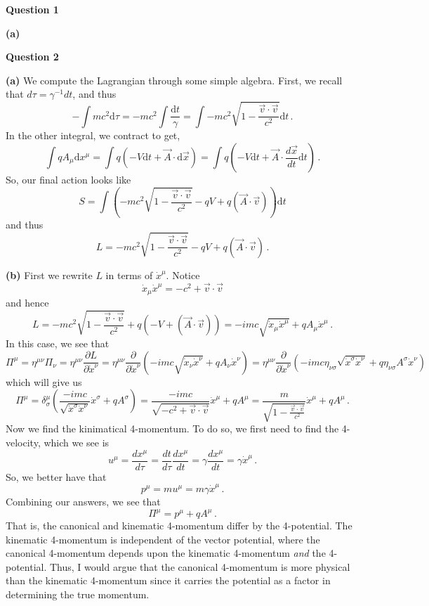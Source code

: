 \documentclass[10pt]{article}
\newcommand{\dif}{\text{d}}
\newcommand{\di}[2][]{\frac{\partial #1}{\partial #2}}
\newcommand{\del}[2][]{\frac{d #1}{d #2}}
\begin{document}
\textbf{Question 1}

\textbf{(a)}

\newpage
\textbf{Question 2}

\textbf{(a)} We compute the Lagrangian through some simple algebra. First, we recall that $d\tau = \gamma^{-1}dt$, and thus
\[ -\int mc^{2}\dif\tau = -mc^{2}\int \frac{\dif t}{\gamma} = \int -mc^{2}\sqrt{1 - \frac{\vec{v}\cdot\vec{v}}{c^{2}}}\dif t\, .\]
In the other integral, we contract to get,
\[ \int qA_{\mu}\dif x^{\mu} = \int q (-V\dif t + \vec{A}\cdot \dif\vec{x}) = \int q\left(-V\dif t + \vec{A}\cdot \del[\vec{x}]{t}\dif t\right)\, . \]
So, our final action looks like
\[ S = \int \left (-mc^{2}\sqrt{1 - \frac{\vec{v}\cdot\vec{v}}{c^{2}}} - qV + q(\vec{A}\cdot \vec{v})\right )\dif t\]
and thus
\[ L = -mc^{2}\sqrt{1 - \frac{\vec{v}\cdot\vec{v}}{c^{2}}} - qV + q(\vec{A}\cdot \vec{v}) \, .\]

\textbf{(b)} First we rewrite $L$ in terms of $\dot{x}^{\mu}$. Notice
\[ \dot{x}_{\mu}\dot{x}^{\mu} = -c^{2} + \vec{v}\cdot\vec{v} \]
and hence
\[ L = -mc^{2}\sqrt{1 - \frac{\vec{v}\cdot\vec{v}}{c^{2}}} + q(-V + (\vec{A}\cdot\vec{v})) = -imc\sqrt{\dot{x}_{\mu}\dot{x}^{\mu}} + qA_{\mu}\dot{x}^{\mu}\, .\]
In this case, we see that
\[ \Pi^{\mu} = \eta^{\mu\nu}\Pi_{\nu} = \eta^{\mu\nu}\di[L]{\dot{x}^{\nu}} = \eta^{\mu\nu}\di{\dot{x}^{\nu}}\left(-imc\sqrt{\dot{x}_{\nu}\dot{x}^{\nu}} + qA_{\nu}\dot{x}^{\nu}\right) = \eta^{\mu\nu}\di{\dot{x}^{\nu}}\left(-imc\eta_{\nu\sigma}\sqrt{\dot{x}^{\sigma}\dot{x}^{\nu}} + q\eta_{\nu\sigma}A^{\sigma}\dot{x}^{\nu}\right) \]
which will give us
\[ \Pi^{\mu} = \delta^{\mu}_{\sigma}\left(\frac{-imc}{\sqrt{\dot{x}^{\sigma}\dot{x}^{\nu}}}\dot{x}^{\sigma} + qA^{\sigma}\right) = \frac{-imc}{\sqrt{-c^{2} + \vec{v}\cdot\vec{v}}}\dot{x}^{\mu} + qA^{\mu} = \frac{m}{\sqrt{1 - \frac{\vec{v}\cdot\vec{v}}{c^{2}}}}\dot{x}^{\mu} + qA^{\mu}\, .\]
Now we find the kinimatical 4-momentum. To do so, we first need to find the 4-velocity, which we see is
\[ u^{\mu} = \del[x^{\mu}]{\tau} = \del[t]{\tau}\del[x^{\mu}]{t} = \gamma\del[x^{\mu}]{t}= \gamma\dot{x}^{\mu} \, .\]
So, we better have that
\[ p^{\mu} = mu^{\mu} = m\gamma\dot{x}^{\mu} \, .\]
Combining our answers, we see that
\[ \Pi^{\mu} = p^{\mu} + qA^{\mu} \, .\]
That is, the canonical and kinematic 4-momentum differ by the 4-potential. The kinematic 4-momentum is independent of the vector potential, where the canonical 4-momentum depends upon the kinematic 4-momentum \textit{and} the 4-potential. Thus, I would argue that the canonical 4-momentum is more physical than the kinematic 4-momentum since it carries the potential as a factor in determining the true momentum.
\end{document}
